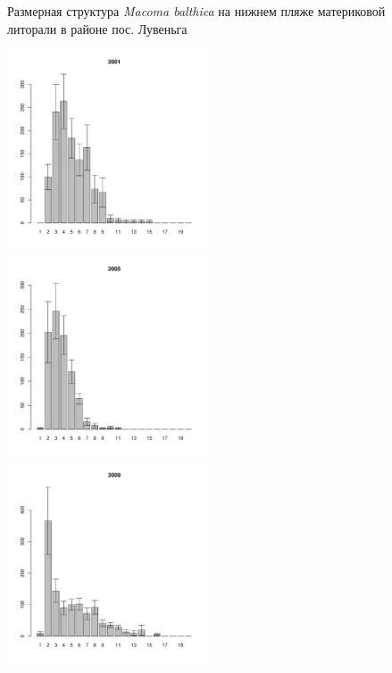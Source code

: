 \begin{figure}[h]
\begin{multicols}{3}
\end{multicols}


\caption{Размерная структура {\it Macoma balthica} на нижнем пляже материковой литорали в районе пос. Лувеньга}
\label{ris:size_str_2razrez_low}
\end{figure}



\begin{figure}[h]

\begin{multicols}{3}
\hfill
\includegraphics[width=60mm]{../White_Sea/Ryashkov_YuG/YuG_2001_.pdf}
\hfill
\includegraphics[width=60mm]{../White_Sea/Ryashkov_YuG/YuG_2005_.pdf}
\hfill
\includegraphics[width=60mm]{../White_Sea/Ryashkov_YuG/YuG_2009_.pdf}
\end{multicols}


\end{figure}
